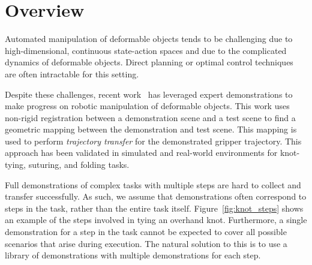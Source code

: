 \documentclass[conference]{IEEEtran}
\begin{document}

\section{Overview}
Automated manipulation of deformable objects tends to be challenging
due to high-dimensional, continuous state-action spaces and due to the
complicated dynamics of deformable objects. Direct planning or optimal
control techniques are often intractable for this setting.

Despite these challenges, recent work~\cite{Schulmanetal_IROS2013,
  Schulmanetal_ISRR2013} has leveraged expert demonstrations to make
progress on robotic manipulation of deformable objects. This work uses
non-rigid registration between a demonstration scene and a test scene
to find a geometric mapping between the demonstration and test scene.
This mapping is used to perform \emph{trajectory transfer} for the
demonstrated gripper trajectory. This approach has been validated in
simulated and real-world environments for knot-tying, suturing, and
folding tasks.

Full demonstrations of complex tasks with multiple steps are hard
to collect and transfer successfully. As such, we assume that
demonstrations often correspond to steps in the task, rather than the
entire task itself. Figure~\ref{fig:knot_steps} shows an example of
the steps involved in tying an overhand knot. Furthermore, a single demonstration
for a step in the task cannot be expected to cover all possible
scenarios that arise during execution.  The natural solution to this
is to use a library of demonstrations with multiple demonstrations for
each step.
\end{document}
